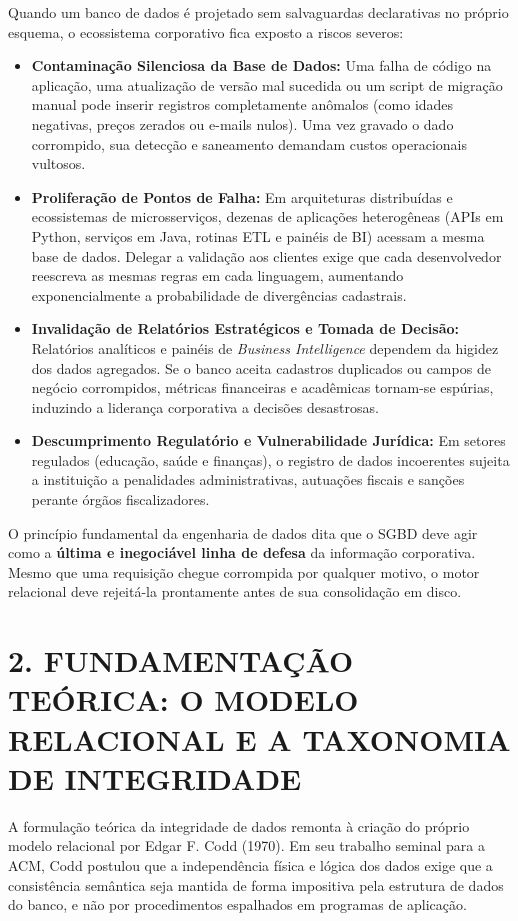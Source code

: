 Quando um banco de dados é projetado sem salvaguardas declarativas no próprio esquema, o ecossistema corporativo fica exposto a riscos severos:
\begin{itemize}
    \item \textbf{Contaminação Silenciosa da Base de Dados:} Uma falha de código na aplicação, uma atualização de versão mal sucedida ou um script de migração manual pode inserir registros completamente anômalos (como idades negativas, preços zerados ou e-mails nulos). Uma vez gravado o dado corrompido, sua detecção e saneamento demandam custos operacionais vultosos.
    \item \textbf{Proliferação de Pontos de Falha:} Em arquiteturas distribuídas e ecossistemas de microsserviços, dezenas de aplicações heterogêneas (APIs em Python, serviços em Java, rotinas ETL e painéis de BI) acessam a mesma base de dados. Delegar a validação aos clientes exige que cada desenvolvedor reescreva as mesmas regras em cada linguagem, aumentando exponencialmente a probabilidade de divergências cadastrais.
    \item \textbf{Invalidação de Relatórios Estratégicos e Tomada de Decisão:} Relatórios analíticos e painéis de \textit{Business Intelligence} dependem da higidez dos dados agregados. Se o banco aceita cadastros duplicados ou campos de negócio corrompidos, métricas financeiras e acadêmicas tornam-se espúrias, induzindo a liderança corporativa a decisões desastrosas.
    \item \textbf{Descumprimento Regulatório e Vulnerabilidade Jurídica:} Em setores regulados (educação, saúde e finanças), o registro de dados incoerentes sujeita a instituição a penalidades administrativas, autuações fiscais e sanções perante órgãos fiscalizadores.
\end{itemize}

O princípio fundamental da engenharia de dados dita que o SGBD deve agir como a \textbf{última e inegociável linha de defesa} da informação corporativa. Mesmo que uma requisição chegue corrompida por qualquer motivo, o motor relacional deve rejeitá-la prontamente antes de sua consolidação em disco.

\newpage

\section*{2. FUNDAMENTAÇÃO TEÓRICA: O MODELO RELACIONAL E A TAXONOMIA DE INTEGRIDADE}

A formulação teórica da integridade de dados remonta à criação do próprio modelo relacional por Edgar F. Codd (1970). Em seu trabalho seminal para a ACM, Codd postulou que a independência física e lógica dos dados exige que a consistência semântica seja mantida de forma impositiva pela estrutura de dados do banco, e não por procedimentos espalhados em programas de aplicação.

